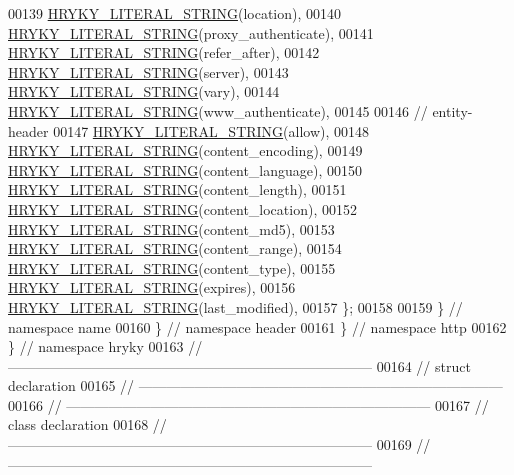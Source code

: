 \begin{DoxyCode}
00139         \hyperlink{common_8h_a9ab2728caa46163f328bd32fe4d9ff12}{HRYKY_LITERAL_STRING}(location),
00140         \hyperlink{common_8h_a9ab2728caa46163f328bd32fe4d9ff12}{HRYKY_LITERAL_STRING}(proxy\_authenticate),
00141         \hyperlink{common_8h_a9ab2728caa46163f328bd32fe4d9ff12}{HRYKY_LITERAL_STRING}(refer\_after),
00142         \hyperlink{common_8h_a9ab2728caa46163f328bd32fe4d9ff12}{HRYKY_LITERAL_STRING}(server),
00143         \hyperlink{common_8h_a9ab2728caa46163f328bd32fe4d9ff12}{HRYKY_LITERAL_STRING}(vary),
00144         \hyperlink{common_8h_a9ab2728caa46163f328bd32fe4d9ff12}{HRYKY_LITERAL_STRING}(www\_authenticate),
00145 
00146         \textcolor{comment}{// entity-header}
00147         \hyperlink{common_8h_a9ab2728caa46163f328bd32fe4d9ff12}{HRYKY_LITERAL_STRING}(allow),
00148         \hyperlink{common_8h_a9ab2728caa46163f328bd32fe4d9ff12}{HRYKY_LITERAL_STRING}(content\_encoding),
00149         \hyperlink{common_8h_a9ab2728caa46163f328bd32fe4d9ff12}{HRYKY_LITERAL_STRING}(content\_language),
00150         \hyperlink{common_8h_a9ab2728caa46163f328bd32fe4d9ff12}{HRYKY_LITERAL_STRING}(content\_length),
00151         \hyperlink{common_8h_a9ab2728caa46163f328bd32fe4d9ff12}{HRYKY_LITERAL_STRING}(content\_location),
00152         \hyperlink{common_8h_a9ab2728caa46163f328bd32fe4d9ff12}{HRYKY_LITERAL_STRING}(content\_md5),
00153         \hyperlink{common_8h_a9ab2728caa46163f328bd32fe4d9ff12}{HRYKY_LITERAL_STRING}(content\_range),
00154         \hyperlink{common_8h_a9ab2728caa46163f328bd32fe4d9ff12}{HRYKY_LITERAL_STRING}(content\_type),
00155         \hyperlink{common_8h_a9ab2728caa46163f328bd32fe4d9ff12}{HRYKY_LITERAL_STRING}(expires),
00156         \hyperlink{common_8h_a9ab2728caa46163f328bd32fe4d9ff12}{HRYKY_LITERAL_STRING}(last\_modified),
00157     \};
00158 
00159 \} \textcolor{comment}{// namespace name}
00160 \} \textcolor{comment}{// namespace header}
00161 \} \textcolor{comment}{// namespace http}
00162 \} \textcolor{comment}{// namespace hryky}
00163 \textcolor{comment}{//
      ------------------------------------------------------------------------------}
00164 \textcolor{comment}{// struct declaration}
00165 \textcolor{comment}{//
      ------------------------------------------------------------------------------}
00166 \textcolor{comment}{//
      ------------------------------------------------------------------------------}
00167 \textcolor{comment}{// class declaration}
00168 \textcolor{comment}{//
      ------------------------------------------------------------------------------}
00169 \textcolor{comment}{//
      ------------------------------------------------------------------------------}

\end{DoxyCode}
